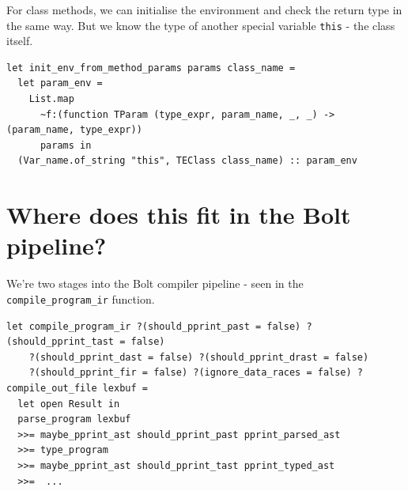 {{For class methods, we can initialise the environment and check the
return type in the same way. But we know the type of another special
variable \texttt{this} - the class itself.

\begin{lstlisting}[language=caml,caption={type\_classes.ml}]
let init_env_from_method_params params class_name =
  let param_env =
    List.map
      ~f:(function TParam (type_expr, param_name, _, _) -> (param_name, type_expr))
      params in
  (Var_name.of_string "this", TEClass class_name) :: param_env

\end{lstlisting}


\hypertarget{where-does-this-fit-in-the-bolt-pipeline}{%
\section{\texorpdfstring{\protect\hyperlink{where-does-this-fit-in-the-bolt-pipeline}{}Where
does this fit in the Bolt
pipeline?}{Where does this fit in the Bolt pipeline?}}\label{where-does-this-fit-in-the-bolt-pipeline}}

We're two stages into the Bolt compiler pipeline - seen in the
\texttt{compile\_program\_ir} function.
\begin{lstlisting}[caption={{compile\_program\_ir.ml}},language=caml]
let compile_program_ir ?(should_pprint_past = false) ?(should_pprint_tast = false)
    ?(should_pprint_dast = false) ?(should_pprint_drast = false)
    ?(should_pprint_fir = false) ?(ignore_data_races = false) ?compile_out_file lexbuf =
  let open Result in
  parse_program lexbuf
  >>= maybe_pprint_ast should_pprint_past pprint_parsed_ast
  >>= type_program
  >>= maybe_pprint_ast should_pprint_tast pprint_typed_ast
  >>=  ...
\end{lstlisting}

%
%

}}
